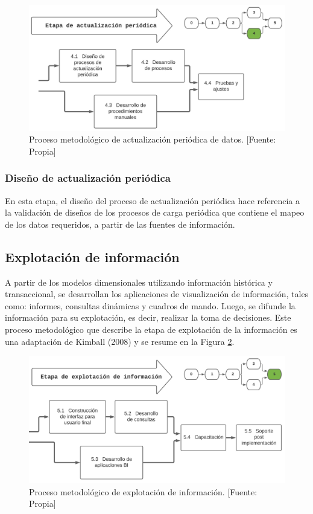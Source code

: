 \documentclass[11pt,titlepage]{report}
\begin{document}
\begin{figure}[h]
	\centering
	\includegraphics[width=1\linewidth]{Figuras/etapa4}
	\caption{Proceso metodológico de actualización periódica de datos. [Fuente: Propia]}
	\label{fig: etapa4}
\end{figure}

\subsubsection{Diseño de actualización periódica}
En esta etapa, el diseño del proceso de actualización periódica hace referencia a la validación de diseños de los procesos de carga periódica que contiene el mapeo de los datos requeridos, a partir de las fuentes de información.


\subsection{Explotación de información} 
A partir de los modelos dimensionales utilizando información histórica y transaccional, se desarrollan los aplicaciones de visualización de información, tales como: informes, consultas dinámicas y cuadros de mando. Luego, se difunde la información para su explotación, es decir, realizar la toma de decisiones. Este proceso metodológico que describe la etapa de explotación de la información es una adaptación de Kimball (2008) y se resume en la Figura \ref{fig: etapa5}.

\begin{figure}[h]
	\centering
	\includegraphics[width=1\linewidth]{Figuras/etapa5}
	\caption{Proceso metodológico de explotación de información. [Fuente: Propia]}
	\label{fig: etapa5}
\end{figure}
\end{document}
